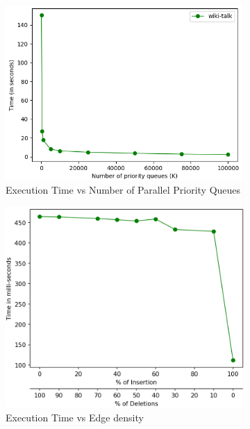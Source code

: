 \documentclass[a4paper]{article}
\begin{document}
\begin{figure}[H]
    \centering
    \begin{subfigure}[b]{0.50\textwidth}
        \centering
        \includegraphics[width=\textwidth]{img/RvK.png}
        \caption{Execution Time vs Number of Parallel Priority Queues}
        \label{fig:runtime_K}
    \end{subfigure}
    \hfill
    \begin{subfigure}[b]{0.47\textwidth}
        \centering
        \includegraphics[width=\textwidth]{img/IDvK.png}
        \caption{Execution Time vs Edge density}
        \label{fig:edge_dens}
    \end{subfigure}
    \caption{}
\end{figure}
\end{document}
